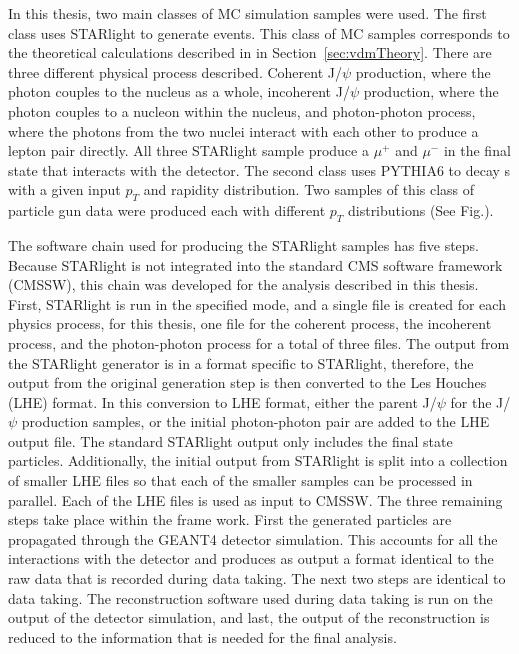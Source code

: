     In this thesis, two main classes of MC simulation samples were used. 
    The first class uses STARlight to generate events.
    This class of MC samples corresponds to the theoretical calculations 
      described in in Section~\ref{sec:vdmTheory}.
    There are three different physical process described.
    Coherent J/$\psi$ production, where the photon couples to the nucleus as
      a whole, incoherent J/$\psi$ production, where the photon couples to a
      nucleon within the nucleus, and photon-photon process, where the photons
      from the two nuclei interact with each other to produce a lepton pair 
      directly.
    All three STARlight sample produce a $\mu^{+}$ and $\mu^{-}$ in the final 
      state that interacts with the detector.
    The second class uses PYTHIA6 to decay \DIFdelbegin {}\DIFdelend \DIFaddbegin {}\DIFaddend s with a given
      input $p_{T}$ and rapidity distribution.
    Two samples of this class of particle gun data were produced each with 
      different $p_{T}$ distributions (See Fig.).

    The software chain used for producing the STARlight samples has five steps.
    Because STARlight is not integrated into the standard CMS software 
      framework (CMSSW), this chain was developed for the analysis described in this
      thesis.
    First, STARlight is run in the specified mode, and a single file is 
      created for each physics process, for this thesis, one file for the 
      coherent process, the incoherent process, and the photon-photon process
      for a total of three files.
    The output from the STARlight generator is in a format specific to 
      STARlight, therefore, the output from the original generation step is 
      then converted to the Les Houches (LHE) format. 
    In this conversion to LHE format, either the parent J/$\psi$ for the 
      J/$\psi$ production samples, or the initial photon-photon pair are added
      to the LHE output file.
    The standard STARlight output only includes the final state particles.
    Additionally, the initial output from STARlight is split into a collection 
      of smaller LHE files so that each of the smaller samples can be 
      processed in parallel.
    Each of the LHE files is used as input to CMSSW.
    The three remaining steps take place within the frame work. 
    First the generated particles are propagated through the GEANT4 detector 
      simulation.
    This accounts for all the interactions with the detector and produces as 
      output a format identical to the raw data that is recorded during data
      taking.
    The next two steps are identical to data taking.
    The reconstruction software used during data taking is run on the output 
      of the detector simulation, and last, the output of the reconstruction
      is reduced to the information that is needed for the final analysis.

